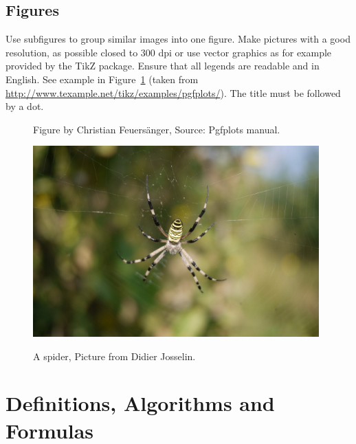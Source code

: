 \documentclass{jimis}
\begin{document}
\subsection{Figures}

Use subfigures to group similar images into one figure. Make pictures with a good resolution, as possible closed to 300 dpi or use vector graphics as for example provided by the TikZ package. Ensure that all legends are readable and in English. See example in Figure~\ref{fig:example} (taken from \url{http://www.texample.net/tikz/examples/pgfplots/}). The title must be followed by a dot.

\begin{figure}
  \centering
  \caption{Figure by Christian Feuers\"anger, Source: Pgfplots manual.}
  \label{fig:example}
\end{figure}

\begin{figure}[h] 
\resizebox{10cm}{7cm}
  {\includegraphics[width=11cm]{Figures/spider.jpg}}
  \centering
  \label{frog}
  \caption{A spider, Picture from Didier Josselin.}
  \end{figure}
  
\section{Definitions, Algorithms and Formulas}
\end{document}
